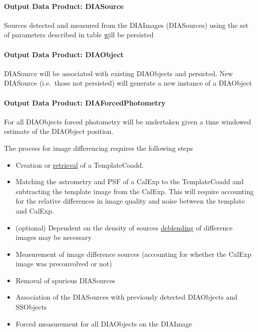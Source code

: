 \paragraph{Output Data Product: DIASource}

Sources detected and measured from the DIAImages (DIASources) using the set of parameters described in table \hyperref[table:ap_features] will be persisted


\paragraph{Output Data Product: DIAObject}

DIASource will be associated with existing DIAObjects and persisted. New DIASource (i.e.\ those not persisted) will generate a new instance of a DIAObject 

\paragraph{Output Data Product: DIAForcedPhotometry}

For all DIAObjects forced photometry will be undertaken given a time windowed estimate of the DIAObject position.


The process for image differencing requires the following steps
\begin{itemize}
\item Creation or \hyperref[sec:acRetrieveTemplate]{retrieval} of a TemplateCoadd.
\item Matching the astrometry and PSF of a CalExp to the TemplateCoadd and subtracting the template image from the CalExp. This will require accounting for the relative differences in image quality and noise between the template and CalExp.
\item (optional) Dependent on the density of sources \hyperref[sec:acSingleFrameDeblending]{deblending} of difference images may be necessary
\item Measurement of image difference sources (accounting for whether the CalExp image was preconvolved or not)
\item Removal of spurious DIASources 
\item Association of the DIASources with previously detected DIAObjects and SSObjects
\item Forced measurement for all DIAObjects on the DIAImage
\end{itemize}



\label{sec:acDCRTemplates}


